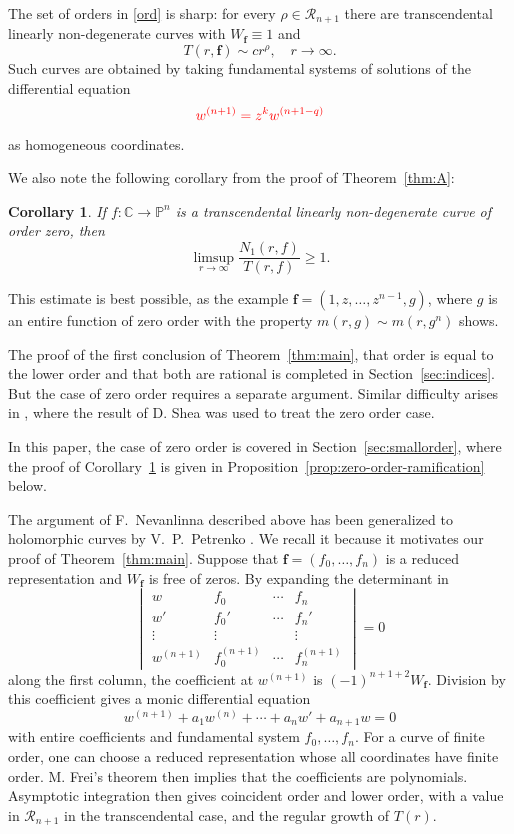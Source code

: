 \documentclass[12pt,letterpaper,reqno]{amsart}
\newtheorem{cor}[thm]{Corollary}
\theoremstyle{definition}
\numberwithin{equation}{section}
\newcommand{\C}{\mathbb C}
\newcommand{\PP}{\mathbb P}
\newcommand{\fv}{\bm f}
\newcommand{\revision}[1]{\textcolor{red}{#1}}
\begin{document}
The set of orders in \eqref{ord} is sharp: for every
\(\rho\in\mathcal R_{n+1}\) there are transcendental linearly
non-degenerate curves with \(W_{\fv}\equiv1\) and
\[
 T(r,\fv)\sim c r^\rho,\quad r\to\infty.
\]
Such curves are obtained by taking fundamental systems of solutions of
the differential equation
\[
\revision{w^{(n+1)}=z^k w^{(n+1-q)}}
\]
as homogeneous coordinates.

We also note the following corollary from the proof of Theorem~\ref{thm:A}:

\begin{cor}\label{cor:zero-ratio}
If $f:\C\to\PP^{n}$ is a transcendental linearly non-degenerate curve
of order zero, then
\[
 \limsup_{r\to\infty}\frac{N_1(r,f)}{T(r,f)}\geq1.
\]
\end{cor}

This estimate is best possible, as the example 
$\fv=(1,z,\ldots,z^{n-1},g)$, where $g$ is an entire function of zero
order with the property $m(r,g)\sim m(r,g^{n})$ shows.

The proof of the first conclusion of Theorem~\ref{thm:main},
that order is equal to the lower order and that both are rational
is completed in Section~\ref{sec:indices}. But the case of zero order
requires a separate argument. Similar difficulty arises in \cite{Ere93},
where the result of D. Shea \cite{She85} was used to treat the zero order case.

In this paper, the case of zero order is
covered in Section~\ref{sec:smallorder},
where
the proof of Corollary~\ref{cor:zero-ratio} is given in
Proposition~\ref{prop:zero-order-ramification} below.

The argument of F.~Nevanlinna described above has been generalized to
holomorphic curves by V.~P.~Petrenko \cite{Pet84}. We recall it because it
motivates our proof of Theorem~\ref{thm:main}. Suppose that
$\fv=(f_0,\ldots,f_{n})$ is a reduced representation
and $W_{\fv}$ is free of zeros. By expanding the determinant in
\[
 \begin{vmatrix}
 w&f_0&\cdots&f_{n}\\
 w'&f_0'&\cdots&f_{n}'\\
 \vdots&\vdots&&\vdots\\
 w^{(n+1)}&f_0^{(n+1)}&\cdots&f_{n}^{(n+1)}
 \end{vmatrix}=0
\]
along the first column, the coefficient at $w^{(n+1)}$ is
$(-1)^{{n+1}+2}W_{\fv}$. Division by this coefficient gives a monic differential
equation
\begin{equation}\label{oper}
 w^{(n+1)}+a_1w^{(n)}+\cdots+a_nw'+a_{n+1}w=0
\end{equation}
with entire coefficients and fundamental system $f_0,\ldots,f_{n}$.
For a curve of finite order, one can choose a reduced representation whose
all coordinates have finite order. M. Frei's theorem \cite{Fre53} then implies
that the coefficients are polynomials. 
Asymptotic integration \cite{Was65}
then gives coincident order and lower order, with a value in
$\mathcal R_{n+1}$ in the transcendental case, and the regular growth
of $T(r)$. 
\end{document}
